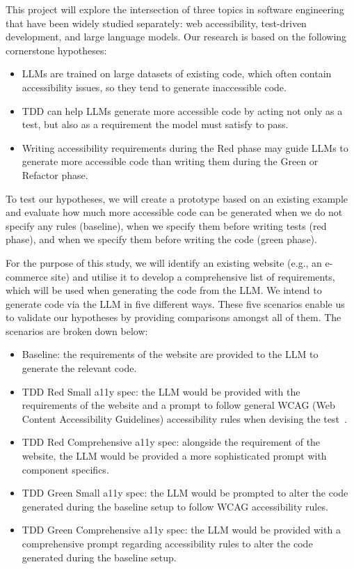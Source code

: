 \documentclass[conference]{IEEEtran}
\begin{document}
This project will explore the intersection of three topics in software engineering that have been widely studied separately: web accessibility, test-driven development, and large language models.
Our research is based on the following cornerstone hypotheses:
\begin{itemize}
  \item LLMs are trained on large datasets of existing code, which often contain accessibility issues, so they tend to generate inaccessible code.
  \item TDD can help LLMs generate more accessible code by acting not only as a test, but also as a requirement the model must satisfy to pass.
  \item Writing accessibility requirements during the Red phase may guide LLMs to generate more accessible code than writing them during the Green or Refactor phase.
\end{itemize}

To test our hypotheses, we will create a prototype based on an existing example and evaluate how much more accessible code can be generated when we do not specify any rules (baseline), when we specify them before writing tests (red phase), and when we specify them before writing the code (green phase).

For the purpose of this study, we will identify an existing website (e.g., an e-commerce site) and utilise it to develop a 
comprehensive list of requirements, which will be used when generating the code from the LLM. We intend to generate code via 
the LLM in five different ways. These five scenarios enable us to validate our hypotheses by providing 
comparisons amongst all of them. The scenarios are broken down below:
 \begin{itemize}
  \item Baseline: the requirements of the website are provided to the LLM to generate the relevant code.
  \item TDD Red Small a11y spec: the LLM would be provided with the requirements of the website and a prompt to follow 
  general WCAG (Web Content Accessibility Guidelines) accessibility rules when devising the test~\cite{w3c2024accessibility}.
  \item TDD Red Comprehensive a11y spec: alongside the requirement of the website, the LLM would be provided a more sophisticated
  prompt with component specifics. 
  \item TDD Green Small a11y spec: the LLM would be prompted to alter the code generated during the baseline setup to follow WCAG accessibility rules.
  \item TDD Green Comprehensive a11y spec: the LLM would be provided with a comprehensive prompt regarding accessibility rules to alter the code generated during the baseline setup.
 \end{itemize}
\end{document}
